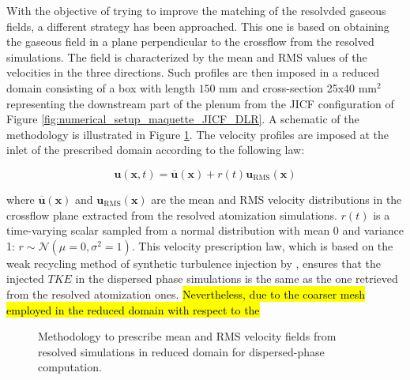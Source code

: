 With the objective of trying to improve the matching of the resolvded gaseous fields, a different strategy has been approached. This one is based on obtaining the gaseous field in a plane perpendicular to the crossflow from the resolved simulations. The field is characterized by the mean and RMS values of the velocities in the three directions. Such profiles are then imposed in a reduced domain consisting of a box with length $150$ mm and cross-section 25x40 mm$^2$ representing the downstream part of the plenum from the JICF configuration of Figure \ref{fig:numerical_setup_maquette_JICF_DLR}. A schematic of the methodology is illustrated in Figure \ref{fig:custom_inlet_methodology}. The velocity profiles are imposed at the inlet of the prescribed domain according to the following law:

\begin{equation}
\textbf{u} \left( \textbf{x}, t \right) = \overline{\textbf{u}} \left( \textbf{x} \right)  + r \left( t \right)  \textbf{u}_\mathrm{RMS} \left( \textbf{x} \right) 
\end{equation}

where $\overline{\textbf{u}} \left( \textbf{x} \right)$ and $\textbf{u}_\mathrm{RMS} \left( \textbf{x} \right)$ are the mean and RMS velocity distributions in the crossflow plane extracted from the resolved atomization simulations. $r \left( t \right)$ is a time-varying scalar sampled from a normal distribution with mean 0 and variance 1: $r \sim \mathcal{N} \left( \mu = 0, \sigma^2 = 1 \right)$. This velocity prescription law, which is based on the weak recycling method of synthetic turbulence injection by \citeColor[wu_large_1995], ensures that the injected $TKE$ in the dispersed phase simulations is the same as the one retrieved from the resolved atomization ones. \hl{Nevertheless, due to the coarser mesh employed in the reduced domain with respect to the }

\begin{figure}[h!]	
	\centering	{}
	\caption{Methodology to prescribe mean and RMS velocity fields from resolved simulations in reduced domain for dispersed-phase computation.}
	\label{fig:custom_inlet_methodology}
\end{figure}

